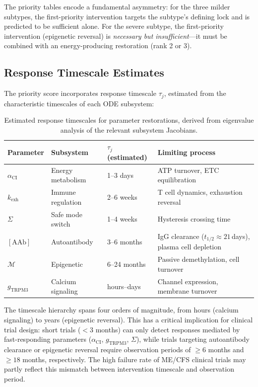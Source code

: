 The priority tables encode a fundamental asymmetry: for the three milder subtypes, the first-priority intervention targets the subtype's defining lock and is predicted to be sufficient alone. For the severe subtype, the first-priority intervention (epigenetic reversal) is \emph{necessary but insufficient}---it must be combined with an energy-producing restoration (rank 2 or 3).

\subsection{Response Timescale Estimates}

The priority score incorporates response timescale $\tau_j$, estimated from the characteristic timescales of each ODE subsystem:

\begin{table}[htbp]
\centering
\caption{Estimated response timescales for parameter restorations, derived from eigenvalue analysis of the relevant subsystem Jacobians.}
\label{tab:response-timescales}
\begin{tabular}{llll}
\hline
Parameter & Subsystem & $\tau_j$ (estimated) & Limiting process \\
\hline
$\alpha_{\text{CI}}$ & Energy metabolism & 1--3 days & ATP turnover, ETC equilibration \\
$k_{\text{exh}}$ & Immune regulation & 2--6 weeks & T cell dynamics, exhaustion reversal \\
$\Sigma$ & Safe mode switch & 1--4 weeks & Hysteresis crossing time \\
$[\text{AAb}]$ & Autoantibody & 3--6 months & IgG clearance ($t_{1/2} \approx 21$\,days), plasma cell depletion \\
$\mathcal{M}$ & Epigenetic & 6--24 months & Passive demethylation, cell turnover \\
$g_{\text{TRPM3}}$ & Calcium signaling & hours--days & Channel expression, membrane turnover \\
\hline
\end{tabular}
\end{table}

The timescale hierarchy spans four orders of magnitude, from hours (calcium signaling) to years (epigenetic reversal). This has a critical implication for clinical trial design: short trials ($< 3$ months) can only detect responses mediated by fast-responding parameters ($\alpha_{\text{CI}}$, $g_{\text{TRPM3}}$, $\Sigma$), while trials targeting autoantibody clearance or epigenetic reversal require observation periods of $\geq 6$ months and $\geq 18$ months, respectively. The high failure rate of ME/CFS clinical trials may partly reflect this mismatch between intervention timescale and observation period.

